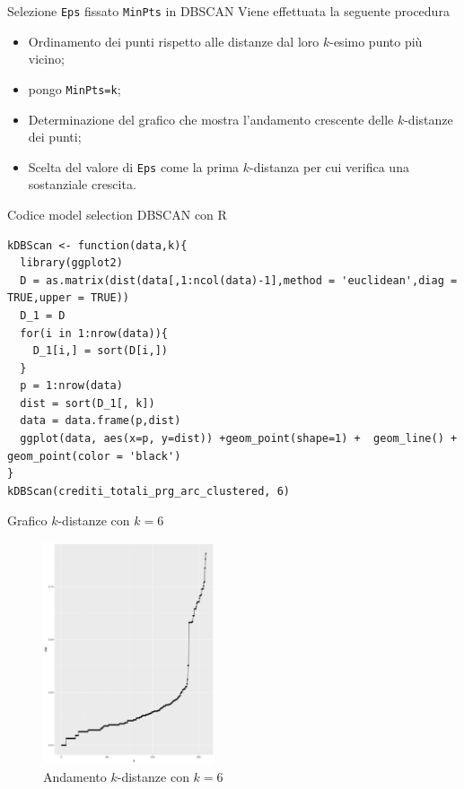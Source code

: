\documentclass{beamer}
\begin{document}
\begin{frame}{Selezione \texttt{Eps} fissato \texttt{MinPts} in DBSCAN}
Viene effettuata la seguente procedura
\begin{itemize}
\item Ordinamento dei punti rispetto alle distanze dal loro $k$-esimo punto più vicino;
\item pongo \texttt{MinPts=k};
\item Determinazione del grafico che mostra l'andamento crescente delle $k$-distanze dei punti;
\item Scelta del valore di \texttt{Eps} come la prima $k$-distanza per cui verifica una sostanziale crescita.
\end{itemize}
\end{frame}

\begin{frame}[fragile]{Codice model selection DBSCAN con R}
  \begin{lstlisting}[caption={Codice R per il calcolo del grafico della k-esima distanza da ogni punto del dataset.}, label={rknn}, captionpos=b, style = R]
kDBScan <- function(data,k){
  library(ggplot2)
  D = as.matrix(dist(data[,1:ncol(data)-1],method = 'euclidean',diag = TRUE,upper = TRUE))
  D_1 = D
  for(i in 1:nrow(data)){
    D_1[i,] = sort(D[i,])
  }
  p = 1:nrow(data)
  dist = sort(D_1[, k])
  data = data.frame(p,dist)
  ggplot(data, aes(x=p, y=dist)) +geom_point(shape=1) +  geom_line() + geom_point(color = 'black')
}
kDBScan(crediti_totali_prg_arc_clustered, 6)
\end{lstlisting}
\end{frame}

\begin{frame}{Grafico $k$-distanze con $k=6$}
  \begin{figure}[bt]
    \begin{center}
    \includegraphics[width = 0.45\textwidth]{../img/eps-minpts6.pdf}
    \caption{Andamento $k$-distanze con $k=6$}
    \end{center}
  \end{figure}
\end{frame}
\end{document}
